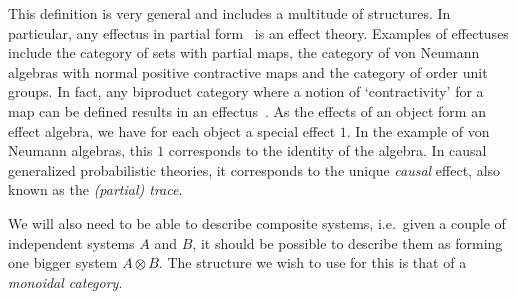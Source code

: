 \documentclass[b5paper,onecolumn,12pt,accepted=2019-05-03, issue=1, volume=1, shorttitle=papers/compositionality-1-1]{compositionalityarticle}
\newcounter{counter}
\numberwithin{counter}{section}
\newtheorem{definition}[counter]{Definition}
\newtheorem{remark}[counter]{Remark}
\begin{document}
This definition is very general and includes a multitude of structures. In particular, any effectus in partial form~\cite{cho2015introduction} is an effect theory. Examples of effectuses include the category of sets with partial maps, the category of von Neumann algebras with normal positive contractive maps and the category of order unit groups. In fact, any biproduct category where a notion of `contractivity' for a map can be defined results in an effectus~\cite{cho2015introduction}. 
As the effects of an object form an effect algebra, we have for each object a special effect $1$. In the example of von Neumann algebras, this $1$ corresponds to the identity of the algebra. In causal generalized probabilistic theories, it corresponds to the unique \emph{causal} effect, also known as the \emph{(partial) trace}.


We will also need to be able to describe composite systems, i.e.\ given a couple of independent systems $A$ and $B$, it should be possible to describe them as forming one bigger system $A\otimes B$. The structure we wish to use for this is that of a \emph{monoidal category}.

\end{document}

